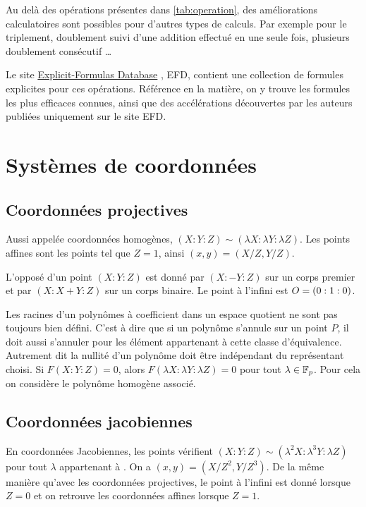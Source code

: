 Au delà des opérations présentes dans \ref{tab:operation}, des améliorations calculatoires sont possibles pour d'autres types de calculs. Par exemple pour le triplement, doublement suivi d'une addition effectué en une seule fois, plusieurs doublement consécutif \ldots 

Le site \og \href{http://www.hyperelliptic.org/EFD/}{Explicit-Formulas Database} \fg{}, EFD, contient une collection de formules explicites pour ces opérations. Référence en la matière, on y trouve les formules les plus efficaces connues, ainsi que des accélérations découvertes par les auteurs publiées uniquement sur le site EFD.


\section{Systèmes de coordonnées}
\subsection{Coordonnées projectives}
Aussi appelée coordonnées homogènes, $(X : Y : Z) \sim (\lambda X : \lambda Y : \lambda Z)$. Les points affines sont les points tel que $Z = 1$, ainsi $(x, y) = (X/Z, Y/Z)$.

L'opposé d'un point $(X : Y : Z)$ est donné par $(X : -Y : Z)$ sur un corps premier et par $(X : X + Y : Z)$ sur un corps binaire. Le point à l'infini est $O = (0 : 1 : 0)$.

Les racines d'un polynômes à coefficient dans un espace quotient ne sont pas toujours bien défini. C'est à dire que si un polynôme s'annule sur un point $P$, il doit aussi s'annuler pour les élément appartenant à cette classe d'équivalence. Autrement dit la nullité d'un polynôme doit être indépendant du représentant choisi. Si $F(X : Y : Z) = 0$, alors $F(\lambda X : \lambda Y : \lambda Z) = 0$ pour tout $\lambda \in \mathbb{F}_{p}$. Pour cela on considère le polynôme homogène associé.


\subsection{Coordonnées jacobiennes}
En coordonnées Jacobiennes, les points vérifient $(X : Y : Z) \sim (\lambda^2 X : \lambda^3 Y : \lambda Z)$ pour tout $\lambda$ appartenant à . On a $(x, y) = (X/Z^2, Y/Z^3)$.
De la même manière qu'avec les coordonnées projectives, le point à l'infini est donné lorsque $Z = 0$ et on retrouve les coordonnées affines lorsque $Z = 1$.



